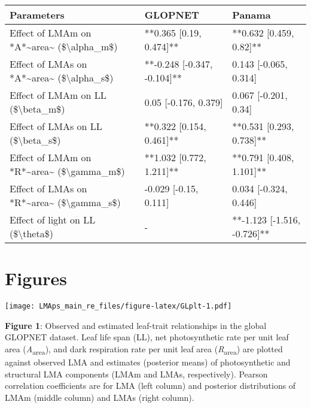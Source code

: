 \documentclass[12pt,]{article}
\theoremstyle{definition}
\theoremstyle{definition}
\theoremstyle{definition}
\theoremstyle{remark}
\begin{document}
\begin{tabular}{l|l|l}
\hline
Parameters & GLOPNET & Panama\\
\hline
Effect of LMAm on *A*\textasciitilde{}area\textasciitilde{} (\$\textbackslash{}alpha\_m\$) & **0.365 [0.19, 0.474]** & **0.632 [0.459, 0.82]**\\
\hline
Effect of LMAs on *A*\textasciitilde{}area\textasciitilde{} (\$\textbackslash{}alpha\_s\$) & **-0.248 [-0.347, -0.104]** & 0.143 [-0.065, 0.314]\\
\hline
Effect of LMAm on LL (\$\textbackslash{}beta\_m\$) & 0.05 [-0.176, 0.379] & 0.067 [-0.201, 0.34]\\
\hline
Effect of LMAs on LL (\$\textbackslash{}beta\_s\$) & **0.322 [0.154, 0.461]** & **0.531 [0.293, 0.738]**\\
\hline
Effect of LMAm on *R*\textasciitilde{}area\textasciitilde{} (\$\textbackslash{}gamma\_m\$) & **1.032 [0.772, 1.211]** & **0.791 [0.408, 1.101]**\\
\hline
Effect of LMAs on *R*\textasciitilde{}area\textasciitilde{} (\$\textbackslash{}gamma\_s\$) & -0.029 [-0.15, 0.111] & 0.034 [-0.324, 0.446]\\
\hline
Effect of light on LL (\$\textbackslash{}theta\$) & - & **-1.123 [-1.516, -0.726]**\\
\hline
\end{tabular}

\newpage

\hypertarget{figures}{%
\section{Figures}\label{figures}}

\texttt{[image: LMAps\_main\_re\_files/figure-latex/GLplt-1.pdf]}

\textbf{Figure 1}: Observed and estimated leaf-trait relationships in
the global GLOPNET dataset. Leaf life span (LL), net photosynthetic rate
per unit leaf area (\emph{A}\textsubscript{area}), and dark respiration
rate per unit leaf area (\emph{R}\textsubscript{area}) are plotted
against observed LMA and estimates (posterior means) of photosynthetic
and structural LMA components (LMAm and LMAs, respectively). Pearson
correlation coefficients are for LMA (left column) and posterior
distributions of LMAm (middle column) and LMAs (right column).

\newpage

\hypertarget{section-1}{%
\section{}\label{section-1}}
\end{document}
